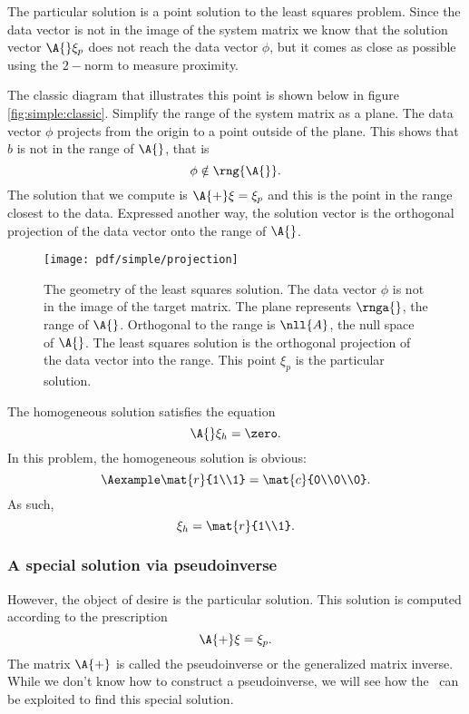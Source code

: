 The particular solution is a point solution to the least squares problem. Since the data vector is not in the image of the system matrix we know that the solution vector $\A{}\xi_{p}$ does not reach the data vector $\phi$, but it comes as close as possible using the $2-$norm to measure proximity.

The classic diagram that illustrates this point is shown below in figure \eqref{fig:simple:classic}. Simplify the range of the system matrix as a plane. The data vector $\phi$ projects from the origin to a point outside of the plane. This shows that $b$ is not in the range of $\A{}$, that is
$$
\phi\notin \rng{\A{}}.
$$
The solution that we compute is $\A{+}\xi=\xi_{p}$ and this is the point in the range closest to the data. Expressed another way, the solution vector is the orthogonal projection of the data vector onto the range of $\A{}$.
\begin{figure}[htbp] %
   \centering
   \texttt{[image: pdf/simple/projection]} 
   \caption[The geometry of the least squares solution]{The geometry of the least squares solution. The data vector $\phi$ is not in the image of the target matrix. The plane represents $\rnga{}$, the range of $\A{}$. Orthogonal to the range is $\nll{A}$, the null space of $\A{}$. The least squares solution is the orthogonal projection of the data vector into the range. This point $\xi_{p}$ is the particular solution.}
   \label{fig:simple:classic}
\end{figure}

The homogeneous solution satisfies the equation
\begin{equation}
  \A{}\xi_{h} = \zero.
\end{equation}
In this problem, the homogeneous solution is obvious:
\begin{equation}
  \Aexample \mat{r}{1\\1} = \mat{c}{0\\0\\0}.
\end{equation}
As such,
\begin{equation}
  \xi_{h} = \mat{r}{1\\1}.
  \label{eq:2:xih}
\end{equation}

\subsubsection{A special solution via pseudoinverse}
However, the object of desire is the particular solution. This solution is computed according to the prescription
\begin{equation}
  \A{+}\xi = \xi_{p}.
\end{equation}
The matrix $\A{+}$ is called the pseudoinverse or the generalized matrix inverse. While we don't know how to construct a pseudoinverse, we will see how the \svdl \ can be exploited to find this special solution.

\endinput